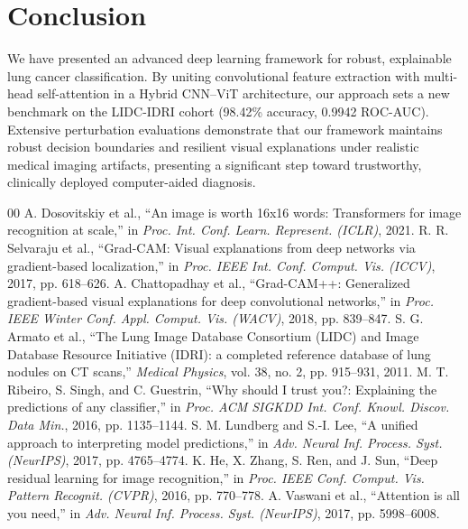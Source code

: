 \documentclass[journal]{IEEEtran}
\begin{document}
\section{Conclusion}
We have presented an advanced deep learning framework for robust, explainable lung cancer classification. By uniting convolutional feature extraction with multi-head self-attention in a Hybrid CNN--ViT architecture, our approach sets a new benchmark on the LIDC-IDRI cohort (98.42\% accuracy, 0.9942 ROC-AUC). Extensive perturbation evaluations demonstrate that our framework maintains robust decision boundaries and resilient visual explanations under realistic medical imaging artifacts, presenting a significant step toward trustworthy, clinically deployed computer-aided diagnosis.

\begin{thebibliography}{00}
 A. Dosovitskiy et al., ``An image is worth 16x16 words: Transformers for image recognition at scale,'' in \textit{Proc. Int. Conf. Learn. Represent. (ICLR)}, 2021.
 R. R. Selvaraju et al., ``Grad-CAM: Visual explanations from deep networks via gradient-based localization,'' in \textit{Proc. IEEE Int. Conf. Comput. Vis. (ICCV)}, 2017, pp. 618--626.
 A. Chattopadhay et al., ``Grad-CAM++: Generalized gradient-based visual explanations for deep convolutional networks,'' in \textit{Proc. IEEE Winter Conf. Appl. Comput. Vis. (WACV)}, 2018, pp. 839--847.
 S. G. Armato et al., ``The Lung Image Database Consortium (LIDC) and Image Database Resource Initiative (IDRI): a completed reference database of lung nodules on CT scans,'' \textit{Medical Physics}, vol. 38, no. 2, pp. 915--931, 2011.
 M. T. Ribeiro, S. Singh, and C. Guestrin, ``Why should I trust you?: Explaining the predictions of any classifier,'' in \textit{Proc. ACM SIGKDD Int. Conf. Knowl. Discov. Data Min.}, 2016, pp. 1135--1144.
 S. M. Lundberg and S.-I. Lee, ``A unified approach to interpreting model predictions,'' in \textit{Adv. Neural Inf. Process. Syst. (NeurIPS)}, 2017, pp. 4765--4774.
 K. He, X. Zhang, S. Ren, and J. Sun, ``Deep residual learning for image recognition,'' in \textit{Proc. IEEE Conf. Comput. Vis. Pattern Recognit. (CVPR)}, 2016, pp. 770--778.
 A. Vaswani et al., ``Attention is all you need,'' in \textit{Adv. Neural Inf. Process. Syst. (NeurIPS)}, 2017, pp. 5998--6008.
\end{thebibliography}
\end{document}
